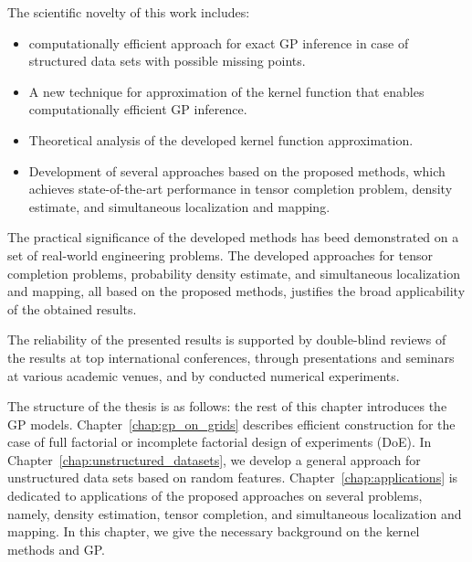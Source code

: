 The scientific novelty of this work includes:
\begin{itemize}
    \item computationally efficient approach
    for exact GP inference in case of structured data sets with possible missing points.
    \item A new technique for approximation of the kernel function that enables
    computationally efficient GP inference.
    \item Theoretical analysis of the developed kernel function approximation.
    \item Development of several approaches based on the proposed methods, which achieves state-of-the-art performance in tensor completion problem, density estimate, and simultaneous localization and mapping.
\end{itemize}

The practical significance of the developed methods has beed demonstrated
on a set of real-world engineering problems.
The developed approaches for tensor completion problems,
probability density estimate, and simultaneous localization and mapping,
all based on the proposed methods, justifies the broad applicability of the obtained results.

The reliability of the presented results is supported
by double-blind reviews of the results at top international conferences,
through presentations and seminars at various academic venues, and by conducted numerical experiments.

The structure of the thesis is as follows:
the rest of this chapter introduces the GP models.
Chapter~\ref{chap:gp_on_grids} describes efficient construction for the
case of full factorial or incomplete factorial design of experiments (DoE).
In Chapter~\ref{chap:unstructured_datasets}, we develop a general approach
for unstructured data sets based on random features.
Chapter~\ref{chap:applications} is dedicated to applications of the proposed
approaches on several problems, namely, density estimation, tensor completion,
and simultaneous localization and mapping.
In this chapter, we give the necessary background on the kernel methods and GP.

